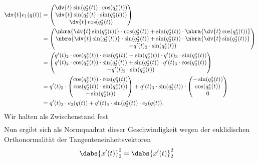 \documentclass{subfiles}
\begin{document}
        \begin{align*}
            \dv{t} e_1(q(t)) &= \begin{pmatrix}\dv{t} \sin(q_2^*(t))\cdot\cos(q_3^*(t))\\\dv{t} \sin(q_2^*(t)\cdot\sin(q_3^*(t)))\\\dv{t} \cos(q_2^*(t))\end{pmatrix}\\
            &= \begin{pmatrix}\nbra{\dv{t} \sin(q_2^*(t))}\cdot\cos(q_3^*(t)) + \sin(q_2^*(t))\cdot\nbra{\dv{t}\cos(q_3^*(t))}\\\nbra{\dv{t} \sin(q_2^*(t))}\cdot\sin(q_3^*(t)) + \sin(q_2^*(t))\cdot\nbra{\dv{t}\sin(q_3^*(t))}\\-q'(t)_2\cdot \sin(q_2^*(t))\end{pmatrix}\\
            &= \begin{pmatrix}q'(t)_2\cdot\cos(q_2^*(t))\cdot\cos(q_3^*(t)) - \sin(q_2^*(t))\cdot q'(t)_3\cdot\sin(q_3^*(t))\\q'(t)_2\cdot \cos(q_2^*(t))\cdot\sin(q_3^*(t)) + \sin(q_2^*(t))\cdot q'(t)_3\cdot \cos(q_3^*(t))\\-q'(t)_2\cdot \sin(q_2^*(t))\end{pmatrix}\\
            &= q'(t)_2\cdot \begin{pmatrix}\cos(q_2^*(t))\cdot\cos(q_3^*(t))\\ \cos(q_2^*(t))\cdot\sin(q_3^*(t))\\ -\sin(q_2^*(t))\end{pmatrix} 
            + q'(t)_3\cdot\sin(q_2^*(t))\cdot\begin{pmatrix}-\sin(q_3^*(t))\\ \cos(q_3^*(t))\\ 0\end{pmatrix}\\
            &= q'(t)_3\cdot e_2(q(t)) + q'(t)_3\cdot\sin(q_2^*(t))\cdot e_3(q(t)).
        \end{align*}
        Wir halten als Zwischenstand fest 
        \begin{align*}
            
        \end{align*}
        Nun ergibt sich als Normquadrat dieser Geschwindigkeit wegen der euklidischen Orthonormalität der Tangenteneinheitsvektoren
        \begin{align*}
            \dabs{x'(t)}^2_2 &= \dabs{x'(t)}^2_2
        \end{align*}
\end{document}
